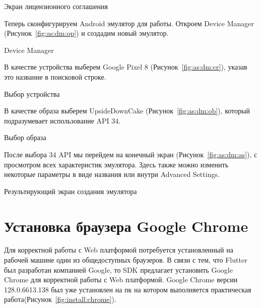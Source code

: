 \begin{image}
	\caption{Экран лицензионного соглашения}
	\label{fig:as:lcz:agg}
\end{image}

\clearpage

Теперь сконфигурируем Android эмулятор для работы.
Откроем Device Manager (Рисунок~\ref{fig:as:dm:op}) и создадим новый эмулятор.

\begin{image}
	\caption{Device Manager}
	\label{fig:as:dm:op}
\end{image}

В качестве устройства выберем Google Pixel 8 (Рисунок~\ref{fig:as:dm:cr}), указав это название в поисковой строке.

\begin{image}
	\caption{Выбор устройства}
	\label{fig:as:dm:cr}
\end{image}

\clearpage

В качестве образа выберем UpsideDownCake (Рисунок~\ref{fig:as:dm:ob}), который подразумевает использование API 34.

\begin{image}
	\caption{Выбор образа}
	\label{fig:as:dm:ob}
\end{image}


После выбора 34 API мы перейдем на конечный экран (Рисунок~\ref{fig:as:dm:as}), с просмотром всех характеристик эмулятора.
Здесь также можно изменить некоторые параметры в виде названия или внутри Advanced Settings.

\begin{image}
	\caption{Результирующий экран создания эмулятора}
	\label{fig:as:dm:as}
\end{image}



\clearpage

\section{Установка браузера Google Chrome}

Для корректной работы с Web платформой потребуется установленный
на рабочей машине один из общедоступных браузеров.
В связи с тем, что Flutter был разработан компанией Google,
то SDK предлагает установить Google Chrome
для корректной работы с Web платформой.
Google Chrome версии 128.0.6613.138 был уже установлен на пк на котором выполняется практическая работа(Рисунок~\ref{fig:install:chrome}).


